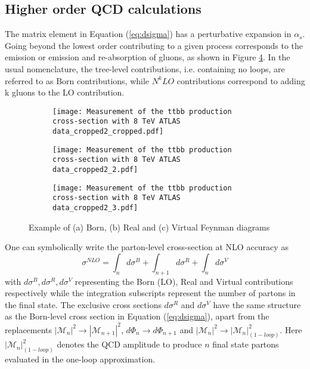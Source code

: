 \subsection{Higher order QCD calculations}\label{subsec:Higher_QCD}
\noindent The matrix element in Equation (\ref{eq:dsigma}) has a perturbative expansion in $\alpha_s$. Going beyond the lowest order contributing to a given process corresponds to the emission or emission and re-absorption of gluons, as shown in Figure \ref{fig:NLO_contributions}. In the usual nomenclature, the tree-level contributions, i.e. containing no loops, are referred to as Born contributions, while $N^kLO$ contributions correspond
to adding k gluons to the LO contribution.
\begin{figure}[H]
    \centering
    \begin{subfigure}{0.32\textwidth}
        \texttt{[image: Measurement of the ttbb production cross-section with 8 TeV ATLAS data\_cropped2\_cropped.pdf]}
        
        \caption{}
        \label{subfig:Born}
    \end{subfigure}
        \begin{subfigure}{0.32\textwidth}
        \texttt{[image: Measurement of the ttbb production cross-section with 8 TeV ATLAS data\_cropped2\_2.pdf]}
        
        \caption{}
        \label{subfig:Real}
    \end{subfigure}
        \begin{subfigure}{0.32\textwidth}
        \texttt{[image: Measurement of the ttbb production cross-section with 8 TeV ATLAS data\_cropped2\_3.pdf]}
        
        \caption{}
        \label{subfig:Virtual}
    \end{subfigure}
    \caption{Example of (a) Born, (b) Real and (c) Virtual Feynman diagrams}
    \label{fig:NLO_contributions}
\end{figure}
One can symbolically write the parton-level cross-section at NLO accuracy as
\begin{equation} \label{eq:sigma_NLO}
    \sigma^{NLO} = \int_n d\sigma^B + \int_{n+1} d\sigma^R + \int_n d\sigma^V
\end{equation}
with $d\sigma^B, d\sigma^R, d\sigma^V$ representing the Born (LO), Real and Virtual contributions respectively while the integration subscripts represent the number of partons in the final state. The exclusive cross sections $d\sigma^R$ and $d\sigma^V$ have the same structure as the Born-level cross section in Equation (\ref{eq:dsigma}), apart from the replacements $|\mathcal{M}_n|^2 \rightarrow |\mathcal{M}_{n+1}|^2$, $d\Phi_n \rightarrow d\Phi_{n+1}$ and $|\mathcal{M}_n|^2 \rightarrow |\mathcal{M}_n|^2_{(1-loop)}$. Here $|\mathcal{M}_n|^2_{(1-loop)}$ denotes the QCD amplitude to produce $n$ final state partons evaluated in the one-loop approximation.\\
